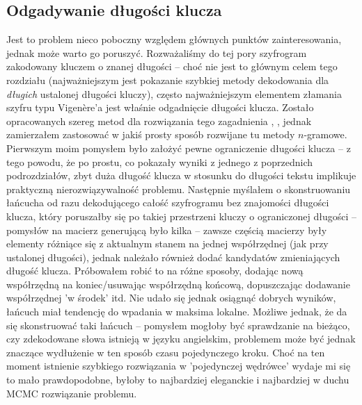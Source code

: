 \documentclass[a4paper]{article}
\theoremstyle{defn}
\theoremstyle{theorem}
\theoremstyle{lemma}
\theoremstyle{cor}
\theoremstyle{fact}
\begin{document}
\subsection{Odgadywanie długości klucza}
Jest to problem nieco poboczny względem głównych punktów zainteresowania, jednak może warto go poruszyć. Rozważaliśmy do tej pory szyfrogram zakodowany kluczem o znanej długości – choć nie jest to głównym celem tego rozdziału (najważniejszym jest pokazanie szybkiej metody dekodowania dla \textit{długich} ustalonej długości kluczy), często najważniejszym elementem złamania szyfru typu Vigenère'a jest właśnie odgadnięcie długości klucza. Zostało opracowanych szereg metod dla rozwiązania tego zagadnienia \cite{kasiski}, \cite{friedman}, jednak zamierzałem zastosować w jakiś prosty sposób rozwijane tu metody $n$-gramowe. Pierwszym moim pomysłem było założyć pewne ograniczenie długości klucza – z tego powodu, że po prostu, co pokazały wyniki z jednego z poprzednich podrozdziałów, zbyt duża długość klucza w stosunku do długości tekstu implikuje praktyczną nierozwiązywalność problemu. Następnie myślałem o skonstruowaniu łańcucha od razu dekodującego całość szyfrogramu bez znajomości długości klucza, który poruszałby się po takiej przestrzeni kluczy o ograniczonej długości – pomysłów na macierz generującą było kilka – zawsze częścią macierzy były elementy różniące się z aktualnym stanem na jednej współrzędnej (jak przy ustalonej długości), jednak należało również dodać kandydatów zmieniających długość klucza. Próbowałem robić to na różne sposoby, dodając nową współrzędną na koniec/usuwając współrzędną końcową, dopuszczając dodawanie współrzędnej 'w środek' itd. Nie udało się jednak osiągnąć dobrych wyników, łańcuch miał tendencję do wpadania w maksima lokalne. Możliwe jednak, że da się skonstruować taki łańcuch – pomysłem mogłoby być sprawdzanie na bieżąco, czy zdekodowane słowa istnieją w języku angielskim, problemem może być jednak znaczące wydłużenie w ten sposób czasu pojedynczego kroku. Choć na ten moment istnienie szybkiego rozwiązania w 'pojedynczej wędrówce' wydaje mi się to mało prawdopodobne, byłoby to najbardziej eleganckie i najbardziej w duchu MCMC rozwiązanie problemu. \\
\end{document}
